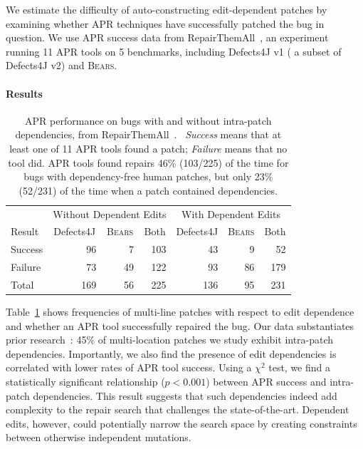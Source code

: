 \documentclass[10pt, conference]{IEEEtran}
\newcommand\bears{\textsc{Bears}\xspace}
\begin{document}
We estimate the difficulty of auto-constructing edit-dependent patches 
by examining whether APR techniques have successfully patched the
bug in question. We use APR success data from 
RepairThemAll~\cite{durieux-repair-them-all}, an experiment 
running 11 APR tools on 5 benchmarks, including Defects4J v1
( a subset of Defects4J v2) and \bears.

\paragraph{Results}

\begin{table}
{\begin{center}
    \begin{tabular}{lrrrrrr}
        \toprule
        &\multicolumn{3}{c}{Without Dependent Edits} & \multicolumn{3}{c}{With Dependent Edits} \\
        Result& \multicolumn{1}{c}{Defects4J} & \multicolumn{1}{c}{\bears} & \multicolumn{1}{c}{Both} & \multicolumn{1}{c}{Defects4J} & \multicolumn{1}{c}{\bears} & \multicolumn{1}{c}{Both} \\
        \midrule
        Success & 96 & 7 & 103 & 43 & 9 &  52 \\
        Failure & 73 & 49 & 122 & 93 & 86 & 179\\
        \midrule
        Total  & 169 & 56 & 225 & 136 & 95 & 231\\
        \bottomrule
    \end{tabular}
 \end{center}
}	\caption{\small APR performance on bugs with and without intra-patch 
      dependencies, from RepairThemAll~\cite{durieux-repair-them-all}.%
      \ \emph{Success} means that at least one of 11 APR tools found a patch; 
      \emph{Failure} means that no tool did.  APR tools found repairs 46\%
      (103/225) of the time for bugs with dependency-free human patches, but only
      23\% (52/231) of the time when a patch contained dependencies.}
	\label{tab:dependency-repair-contingency-table}
\end{table}

Table~\ref{tab:dependency-repair-contingency-table}
shows frequencies of multi-line patches with respect to edit dependence 
and whether an APR tool successfully repaired the bug.
Our data substantiates prior research~\cite{zhong2015}:
45\% of multi-location patches we study exhibit intra-patch dependencies. 
Importantly, 
we also find the presence of edit dependencies is correlated with lower rates of
APR tool success. 
Using a $\chi^2$ test, we find a statistically significant relationship ($p < 0.001$)
between APR success and intra-patch dependencies.
This result 
suggests that such dependencies indeed 
add complexity to the repair search that challenges the state-of-the-art.
Dependent edits, however, could
potentially narrow the search space by creating constraints between 
otherwise independent mutations. 
\end{document}
